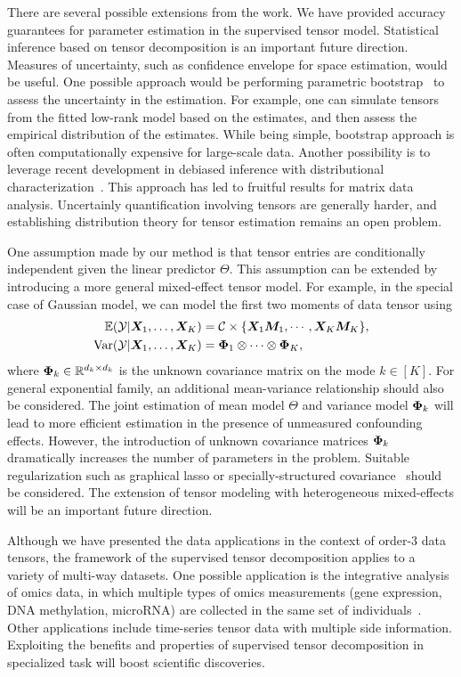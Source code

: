 \documentclass[12pt]{article}
\theoremstyle{definition}
\theoremstyle{definition}
\begin{document}
There are several possible extensions from the work. We have provided accuracy guarantees for parameter estimation in the supervised tensor model. Statistical inference based on tensor decomposition is an important future direction. Measures of uncertainty, such as confidence envelope for space estimation, would be useful. One possible approach would be performing parametric bootstrap~\citep{efron1994introduction} to assess the uncertainty in the estimation. 
For example, one can simulate tensors from the fitted low-rank model based on the estimates, and then assess the empirical distribution of the estimates. 
While being simple, bootstrap approach is often computationally expensive for large-scale data. Another possibility is to leverage recent development in debiased inference with distributional characterization~\citep{chen2019inference}. This approach has led to fruitful results for matrix data analysis. Uncertainly quantification involving tensors are generally harder, and establishing distribution theory for tensor estimation remains an open problem.

One assumption made by our method is that tensor entries are conditionally independent given the linear predictor $\Theta$. This assumption can be extended by introducing a more general mixed-effect tensor model. For example, in the special case of Gaussian model, we can model the first two moments of data tensor using
\begin{align}\label{eq:extention}
\mathbb{E}(\mathcal{Y}|\bm X_1,\ldots,\bm X_K)&=\mathcal{C}\times\{\bm X_1\bm M_1, \cdots, \bm X_K \bm M_K\},\\
 \text{Var}(\mathcal{Y}|\bm X_1,\ldots,\bm X_K)&=\bm{\Phi}_1\otimes \cdots \otimes \bm{\Phi}_K,
\end{align}
where $\bm{\Phi}_k\in\mathbb{R}^{d_k\times d_k}$ is the unknown covariance matrix on the mode $k\in[K]$. For general exponential family, an additional mean-variance relationship should also be considered. The joint estimation of mean model $\Theta$ and variance model $\bm{\Phi}_k$ will lead to more efficient estimation in the presence of unmeasured confounding effects. However, the introduction of unknown covariance matrices $\bm{\Phi}_k$ dramatically increases the number of parameters in the problem. {  Suitable regularization such as graphical lasso or specially-structured covariance~\citep{li2017parsimonious,lock2018supervised} should be considered.} The extension of tensor modeling with heterogeneous mixed-effects will be an important future direction. 

Although we have presented the data applications in the context of order-3 data tensors, the framework of the supervised tensor decomposition applies to a variety of multi-way datasets. One possible application is the integrative analysis of omics data, in which multiple types of omics measurements (gene expression, DNA methylation, microRNA) are collected in the same set of individuals~\citep{lock2013joint,wang2019three}. Other applications include time-series tensor data with multiple side information. Exploiting the benefits and properties of  supervised tensor decomposition in specialized task will boost scientific discoveries.
\end{document}
